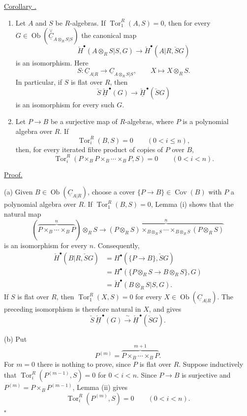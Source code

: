 \underline{Corollary .}

\begin{enumerate}[label=(\alph*)]
\item Let $A$ and $S$ be $R$-algebras. If
$\operatorname{Tor}_1^R(A,S)=0$, then for every
$G\in\operatorname{Ob}
(\overset{\vee}{\underline C}_{A\otimes_RS|S})$ the canonical map
\[
 \check H^{\bullet}(A\otimes_RS|S,G)
 \longrightarrow\check H^{\bullet}(A|R,\check SG)
\]
is an isomorphism. Here
\[
 S:\underline C_{A|R}\longrightarrow
 \underline C_{A\otimes_RS|S},
 \qquad X\longmapsto X\otimes_RS.
\]
In particular, if $S$ is flat over $R$, then
\[
 \check S\,\check{\underline H}^{\,\bullet}(G)
 \longrightarrow
 \check{\underline H}^{\,\bullet}(\check SG)
\]
is an isomorphism for every such $G$.

\item Let $P\longrightarrow B$ be a surjective map of $R$-algebras,
where $P$ is a polynomial algebra over $R$. If
\[
 \operatorname{Tor}_i^R(B,S)=0\qquad(0<i\leq n),
\]
then, for every iterated fibre product of copies of $P$ over $B$,
\[
 \operatorname{Tor}_i^R
 (P\times_B P\times_B\cdots\times_B P,S)=0
 \qquad(0<i<n).
\]
\end{enumerate}

\underline{Proof.}

(a) Given $B\in\operatorname{Ob}(\underline C_{A|R})$, choose a
cover $\{P\longrightarrow B\}\in\operatorname{Cov}(B)$ with $P$ a
polynomial algebra over $R$. If
$\operatorname{Tor}_1^R(B,S)=0$, Lemma (i) shows that the natural
map
\[
 \left(\overbrace{P\times_B\cdots\times_BP}^{n}\right)\otimes_RS
 \longrightarrow
 \overbrace{(P\otimes_RS)\times_{B\otimes_RS}\cdots
 \times_{B\otimes_RS}(P\otimes_RS)}^{n}
\]
is an isomorphism for every $n$. Consequently,
\begin{align*}
 \check H^{\bullet}(B|R,\check SG)
 &=H^{\bullet}(\{P\longrightarrow B\},\check SG)\\
 &=H^{\bullet}(\{P\otimes_RS\longrightarrow B\otimes_RS\},G)\\
 &=\check H^{\bullet}(B\otimes_RS|S,G).
\end{align*}
If $S$ is flat over $R$, then
$\operatorname{Tor}_1^R(X,S)=0$ for every
$X\in\operatorname{Ob}(\underline C_{A|R})$. The preceding
isomorphism is therefore natural in $X$, and gives
\[
 \check S\,\check{\underline H}^{\,\bullet}(G)
 \xrightarrow{\ \sim\ }
 \check{\underline H}^{\,\bullet}(\check SG).
\]

(b) Put
\[
 P^{(m)}=\overbrace{P\times_B\cdots\times_BP}^{m+1}.
\]
For $m=0$ there is nothing to prove, since $P$ is flat over $R$.
Suppose inductively that
$\operatorname{Tor}_i^R(P^{(m-1)},S)=0$ for $0<i<n$. Since
$P\longrightarrow B$ is surjective and
$P^{(m)}=P\times_BP^{(m-1)}$, Lemma (ii) gives
\[
 \operatorname{Tor}_i^R(P^{(m)},S)=0\qquad(0<i<n).
\]
\hfill$\square$
